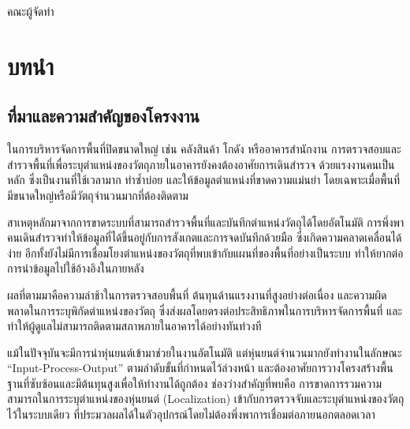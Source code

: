 \documentclass[a4paper,12pt]{report}
\newcounter{savedfront}
\newcommand{\savefrontpage}{\setcounter{savedfront}{\value{page}}}
\begin{document}
\vspace{1cm}
\begin{flushright}
คณะผู้จัดทำ
\end{flushright}

\clearpage
\tableofcontents
\clearpage
\listoftables
\clearpage
\listoffigures

\clearpage
\savefrontpage


\chapter{บทนำ}

\section{ที่มาและความสำคัญของโครงงาน}

ในการบริหารจัดการพื้นที่ปิดขนาดใหญ่ เช่น คลังสินค้า โกดัง หรืออาคารสำนักงาน
การตรวจสอบและสำรวจพื้นที่เพื่อระบุตำแหน่งของวัตถุภายในอาคารยังคงต้องอาศัยการเดินสำรวจ
ด้วยแรงงานคนเป็นหลัก ซึ่งเป็นงานที่ใช้เวลามาก ทำซ้ำบ่อย และให้ข้อมูลตำแหน่งที่ขาดความแม่นยำ
โดยเฉพาะเมื่อพื้นที่มีขนาดใหญ่หรือมีวัตถุจำนวนมากที่ต้องติดตาม

สาเหตุหลักมาจากการขาดระบบที่สามารถสำรวจพื้นที่และบันทึกตำแหน่งวัตถุได้โดยอัตโนมัติ
การพึ่งพาคนเดินสำรวจทำให้ข้อมูลที่ได้ขึ้นอยู่กับการสังเกตและการจดบันทึกด้วยมือ
ซึ่งเกิดความคลาดเคลื่อนได้ง่าย
อีกทั้งยังไม่มีการเชื่อมโยงตำแหน่งของวัตถุที่พบเข้ากับแผนที่ของพื้นที่อย่างเป็นระบบ
ทำให้ยากต่อการนำข้อมูลไปใช้อ้างอิงในภายหลัง

ผลที่ตามมาคือความล่าช้าในการตรวจสอบพื้นที่ ต้นทุนด้านแรงงานที่สูงอย่างต่อเนื่อง
และความผิดพลาดในการระบุพิกัดตำแหน่งของวัตถุ
ซึ่งส่งผลโดยตรงต่อประสิทธิภาพในการบริหารจัดการพื้นที่
และทำให้ผู้ดูแลไม่สามารถติดตามสภาพภายในอาคารได้อย่างทันท่วงที

แม้ในปัจจุบันจะมีการนำหุ่นยนต์เข้ามาช่วยในงานอัตโนมัติ
แต่หุ่นยนต์จำนวนมากยังทำงานในลักษณะ ``Input-Process-Output''
ตามลำดับขั้นที่กำหนดไว้ล่วงหน้า
และต้องอาศัยการวางโครงสร้างพื้นฐานที่ซับซ้อนและมีต้นทุนสูงเพื่อให้ทำงานได้ถูกต้อง
ช่องว่างสำคัญที่พบคือ การขาดการรวมความสามารถในการระบุตำแหน่งของหุ่นยนต์ (Localization)
เข้ากับการตรวจจับและระบุตำแหน่งของวัตถุไว้ในระบบเดียว
ที่ประมวลผลได้ในตัวอุปกรณ์โดยไม่ต้องพึ่งพาการเชื่อมต่อภายนอกตลอดเวลา
\end{document}

